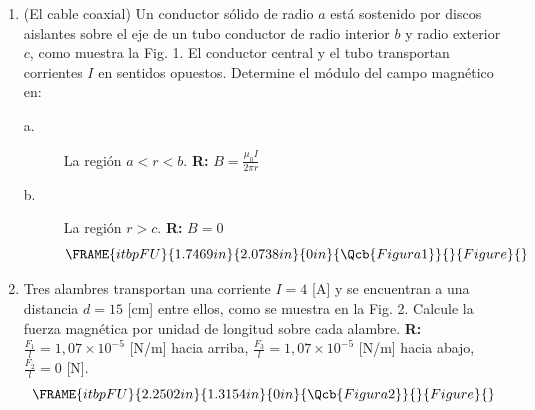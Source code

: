 \documentclass[12pt]{article}
\begin{document}
\begin{enumerate}
\item (El cable coaxial) Un conductor s\'{o}lido de radio $a$ est\'{a}
sostenido por discos aislantes sobre el eje de un tubo conductor de radio
interior $b$ y radio exterior $c$, como muestra la Fig. 1. El conductor
central y el tubo transportan corrientes $I$ en sentidos opuestos. Determine
el m\'{o}dulo del campo magn\'{e}tico en:

\begin{description}
\item[a.] La regi\'{o}n $a<r<b$. \textbf{R: }$B=\frac{\mu _{0}I}{2\pi r}$

\item[b.] La regi\'{o}n $r>c$. \textbf{R: }$B=0$%
\begin{equation*}
\FRAME{itbpFU}{1.7469in}{2.0738in}{0in}{\Qcb{Figura 1}}{}{Figure}{\special%
{language "Scientific Word";type "GRAPHIC";maintain-aspect-ratio
TRUE;display "USEDEF";valid_file "T";width 1.7469in;height 2.0738in;depth
0in;original-width 3.6633in;original-height 4.3578in;cropleft "0";croptop
"1";cropright "1";cropbottom "0";tempfilename
'R3IG7W01.wmf';tempfile-properties "XPR";}}
\end{equation*}
\end{description}

\item Tres alambres transportan una corriente $I=4$ [A] y se encuentran a
una distancia $d=15$ [cm] entre ellos, como se muestra en la Fig. 2. Calcule
la fuerza magn\'{e}tica por unidad de longitud sobre cada alambre. \textbf{%
R: }$\frac{F_{1}}{l}=1,07\times 10^{-5}$ [N/m] hacia arriba, $\frac{F_{3}}{l}%
=1,07\times 10^{-5}$ [N/m] hacia abajo, $\frac{F_{2}}{l}=0$ [N]. \textbf{\ }%
\begin{equation*}
\FRAME{itbpFU}{2.2502in}{1.3154in}{0in}{\Qcb{Figura 2}}{}{Figure}{\special%
{language "Scientific Word";type "GRAPHIC";maintain-aspect-ratio
TRUE;display "USEDEF";valid_file "T";width 2.2502in;height 1.3154in;depth
0in;original-width 4.248in;original-height 2.4708in;cropleft "0";croptop
"1";cropright "1";cropbottom "0";tempfilename
'R3IG7X02.wmf';tempfile-properties "XPR";}}
\end{equation*}


\end{enumerate}
\end{document}
